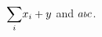\documentclass{article}
\begin{document}
$\mathlarger{\sum}_{i} x_i + y$ and $a \mathsmaller{b} c$.
\end{document}
